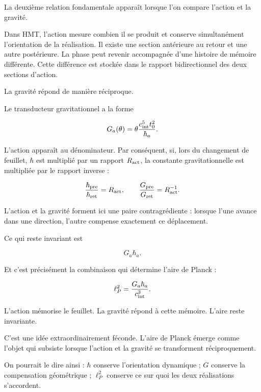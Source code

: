La deuxième relation fondamentale apparaît lorsque l’on compare l’action et la gravité.\par

Dans HMT, l’action mesure combien il se produit et conserve simultanément l’orientation de la réalisation. Il existe une section antérieure au retour et une autre postérieure. La phase peut revenir accompagnée d’une histoire de mémoire différente. Cette différence est stockée dans le rapport bidirectionnel des deux sections d’action.\par

La gravité répond de manière réciproque.\par

Le transducteur gravitationnel a la forme\par

\[
G_a(\theta)
=
\theta\frac{c_{\rm int}^{5}t_0^2}{\hbar_a}.
\]

L’action apparaît au dénominateur. Par conséquent, si, lors du changement de feuillet, \(\hbar\) est multiplié par un rapport \(R_{\rm act}\), la constante gravitationnelle est multipliée par le rapport inverse :\par

\[
\frac{\hbar_{\rm pre}}{\hbar_{\rm ret}}
=
R_{\rm act},
\qquad
\frac{G_{\rm pre}}{G_{\rm ret}}
=
R_{\rm act}^{-1}.
\]

L’action et la gravité forment ici une paire contragrédiente : lorsque l’une avance dans une direction, l’autre compense exactement ce déplacement.\par

Ce qui reste invariant est\par

\[
G_a\hbar_a.
\]

Et c’est précisément la combinaison qui détermine l’aire de Planck :\par

\[
\ell_P^2=\frac{G_a\hbar_a}{c_{\rm int}^3}.
\]

L’action mémorise le feuillet. La gravité répond à cette mémoire. L’aire reste invariante.\par

C’est une idée extraordinairement féconde. L’aire de Planck émerge comme l’objet qui subsiste lorsque l’action et la gravité se transforment réciproquement.\par

On pourrait le dire ainsi : \(\hbar\) conserve l’orientation dynamique ; \(G\) conserve la compensation géométrique ; \(\ell_P^2\) conserve ce sur quoi les deux réalisations s’accordent.\par

